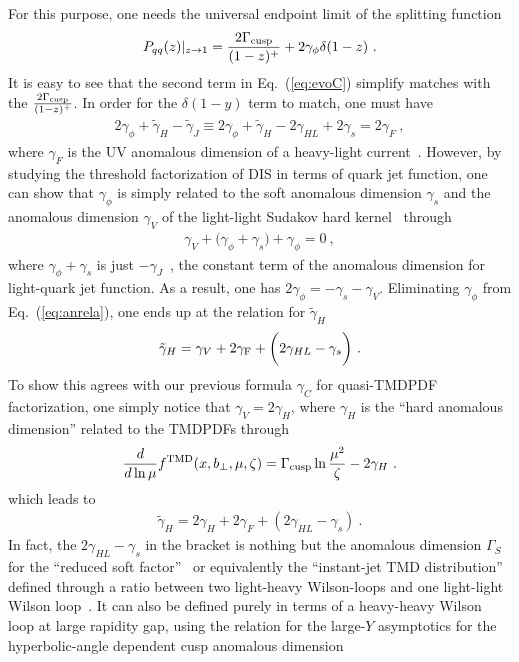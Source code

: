\documentclass[a4paper,11pt]{article}
\begin{document}
For this purpose, one needs the universal endpoint limit of the splitting function~\cite{Moch:2004pa,Becher:2006mr}
\begin{align}
P_{qq}(z)|_{z\rightarrow 1}=\frac{2\Gamma_{\rm cusp}}{(1-z)^+}+2\gamma_{\phi} \delta(1-z) \ .
\end{align}
It is easy to see that the second term in Eq.~(\ref{eq:evoC}) simplify matches with the $\frac{2\Gamma_{\rm cusp}}{(1-z)^+}$. In order for the $\delta(1-y)$ term to match, one must have
\begin{align}\label{eq:anrela}
2\gamma_{\phi}+\tilde \gamma_{H}-\tilde \gamma_{J}\equiv 2\gamma_{\phi}+\tilde \gamma_{H}-2\gamma_{HL}+2\gamma_s=2\gamma_F \ ,
\end{align}
where $\gamma_F$ is the UV anomalous dimension of a heavy-light current~\cite{Ji:1991pr, Chetyrkin:2003vi}. However, by studying the threshold factorization of DIS in terms of quark jet function, one can show that $\gamma_{\phi}$ is simply related to the soft anomalous dimension $\gamma_s$ and the anomalous dimension $\gamma_V$ of the light-light Sudakov hard kernel~\cite{Moch:2005id} through
\begin{align}
\gamma_{V}+\bigg(\gamma_{\phi}+\gamma_s\bigg)+\gamma_{\phi}=0 \ ,
\end{align}
where $\gamma_{\phi}+\gamma_{s}$ is just $-\gamma_{J}$~\cite{Becher:2006mr,Becher:2006qw}, the constant term of the anomalous dimension for light-quark jet function. As a result, one has $2\gamma_{\phi}=-\gamma_s-\gamma_V$. Eliminating $\gamma_{\phi}$ from Eq.~(\ref{eq:anrela}), one ends up at the relation for $\tilde \gamma_{H}$
\begin{align}
\tilde \gamma_{H}=\gamma_V+2\gamma_{\rm F}+\bigg(2\gamma_{HL}-\gamma_s\bigg) \ .
\end{align}
To show this agrees with our previous formula $\gamma_C$ for quasi-TMDPDF factorization, one simply notice that $\gamma_V=2\gamma_H$, where $\gamma_H$ is the ``hard anomalous dimension'' related to the TMDPDFs through~\cite{Ebert:2019okf,Luo:2019hmp}
\begin{align}
\frac{d}{d\ln \mu}f^{\rm TMD}(x,b_\perp,\mu,\zeta)=\Gamma_{\rm cusp}\ln \frac{\mu^2}{\zeta}-2\gamma_H \ .
\end{align}
which leads to
\begin{align}
\tilde \gamma_H=2\gamma_H+2\gamma_F+(2\gamma_{HL}-\gamma_s) \ .
\end{align}
In fact, the $2\gamma_{HL}-\gamma_s$ in the bracket is nothing but the anomalous dimension $\Gamma_S$ for the ``reduced soft factor''~\cite{Ji:2019ewn,Li:2020xml,Ji:2021znw} or equivalently the ``instant-jet TMD distribution''~\cite{Vladimirov:2020ofp} defined through a ratio between two light-heavy Wilson-loops and one light-light Wilson loop~\cite{Ji:2021znw}. It can also be defined purely in terms of a heavy-heavy Wilson loop at large rapidity gap, using the relation for the large-$Y$ asymptotics for the hyperbolic-angle dependent cusp anomalous dimension~\cite{Korchemsky:1987wg,Grozin:2015kna}
\end{document}
